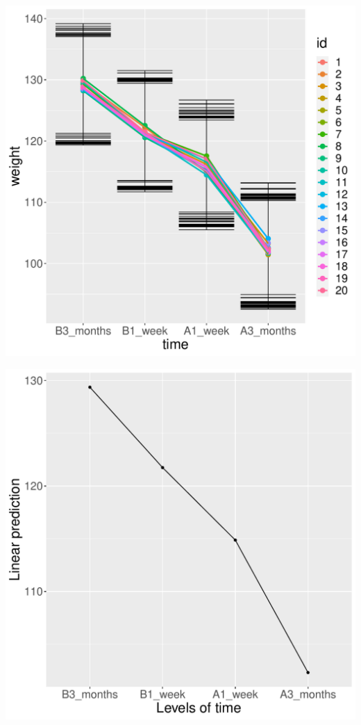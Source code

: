 \documentclass[12pt]{article}
\begin{document}
\begin{minipage}{0.45\linewidth}
\begin{center}
\includegraphics[width=\textwidth]{./figures/fit-autoplot.pdf}
\end{center}
\end{minipage}
\begin{minipage}{0.45\linewidth}
\begin{center}
\includegraphics[width=\textwidth]{./figures/fit-emmip.pdf}
\end{center}
\end{minipage}
\end{document}
